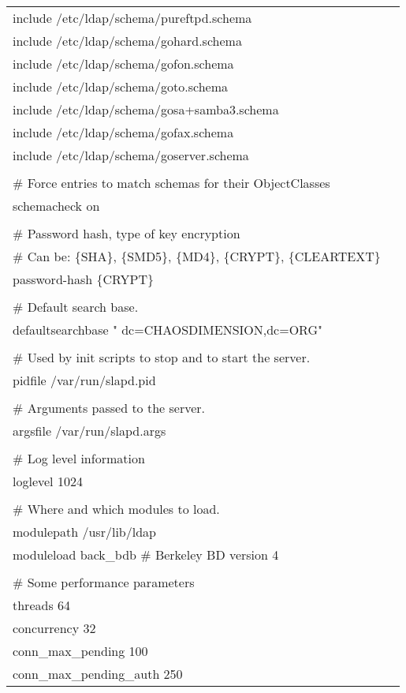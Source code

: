 \begin{center}
\begin{longtable}{|ll|}
include		/etc/ldap/schema/pureftpd.schema & \\
include		/etc/ldap/schema/gohard.schema & \\
include		/etc/ldap/schema/gofon.schema & \\
include		/etc/ldap/schema/goto.schema & \\
include		/etc/ldap/schema/gosa+samba3.schema & \\
include		/etc/ldap/schema/gofax.schema & \\
include		/etc/ldap/schema/goserver.schema & \\
 & \\
\# Force entries to match schemas for their ObjectClasses & \\
schemacheck             on & \\
 & \\
\# Password hash, type of key encryption & \\
\# Can be: \{SHA\}, \{SMD5\}, \{MD4\}, \{CRYPT\}, \{CLEARTEXT\} & \\
password-hash           \{CRYPT\} & \\
 & \\
\# Default search base. & \\
defaultsearchbase       " dc=CHAOSDIMENSION,dc=ORG"  & \\
 & \\
\# Used by init scripts to stop and to start the server. & \\
pidfile         /var/run/slapd.pid & \\
 & \\
\# Arguments passed to the server. & \\
argsfile        /var/run/slapd.args & \\
 & \\
\# Log level information & \\
loglevel        1024 & \\
 & \\
\# Where and which modules to load. & \\
modulepath      /usr/lib/ldap & \\
moduleload      back\_bdb \# Berkeley BD version 4 & \\
 & \\
\# Some performance parameters & \\
threads 64 & \\
concurrency 32 & \\
conn\_max\_pending 100 & \\
conn\_max\_pending\_auth 250 & \\

\end{longtable}
\end{center}
